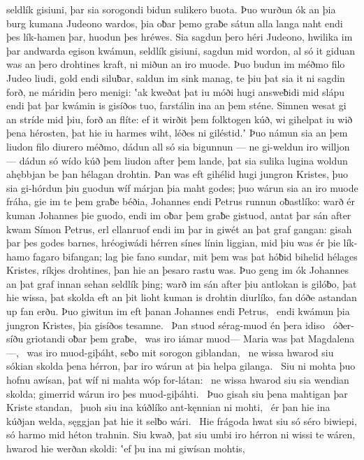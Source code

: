 seldlík gisiuni, þar sia sorogondi
bidun sulikero buota. Þuo wurðun ók an þia burg kumana
Judeono wardos, þia oƀar þemo graƀe sátun
alla langa naht endi þes lík-hamen þar,
huodun þes hréwes. Sia sagdun þero héri Judeono,
hwilika im þar andwarda egison kwámun,
seldlík gisiuni, sagdun mid wordon,
al só it giduan was an þero drohtines kraft,
ni miðun an iro muode. Þuo budun im méðmo filo
Judeo liudi, gold endi siluƀar,
saldun im sink manag, te þiu þat sia it ni sagdin forð,
ne máridin þero menigi: ʽak kweðat þat iu móði hugi
answeƀidi mid slápu endi þat þar kwámin is gisíðos tuo,
farstálin ina an þem sténe. Simnen wesat gi an stríde mid þiu,
forð an flíte: ef it wirðit þem folktogen kúð,
wi gihelpat iu wið þena hérosten, þat hie iu harmes wiht,
léðes ni giléstid.ʼ Þuo námun sia an þem liudon filo
diurero méðmo, dádun all só sia bigunnun
— ne gi-weldun iro willjon — dádun só wído kúð
þem liudon after þem lande, þat sia sulika lugina woldun
ahębbjan be þan hélagan drohtin. Þan was eft gihélid hugi
jungron Kristes, þuo sia gi-hórdun þiu guodun wíf
márjan þia maht godes; þuo wárun sia an iro muode fráha,
gie im te þem graƀe béðia, Johannes endi Petrus
runnun oƀastlíko: warð ér kuman
Johannes þie guodo, endi im oƀar þem graƀe gistuod,
antat þar sán after kwam Símon Petrus,
erl ellanruof endi im þar in giwét
an þat graf gangan: gisah þar þes godes barnes,
hréogiwádi hérren sínes
línin liggian, mid þiu was ér þie lík-hamo
fagaro bifangan; lag þie fano sundar,
mit þem was þat hóƀid bihelid hélages Kristes,
ríkjes drohtines, þan hie an þesaro rastu was.
Þuo geng im ók Johannes an þat graf innan
sehan seldlík þing; warð im sán after þiu
antlokan is gilóƀo, þat hie wissa, þat skolda eft an þit lioht kuman
is drohtin diurlíko, fan dóðe astandan
up fan erðu. Þuo giwitun im eft þanan
Johannes endi Petrus, \hld\ endi kwámun þia jungron Kristes,
þia gisíðos tesamne. \hld\ Þan stuod sérag-muod
én þera idiso \hld\ óðer-síðu
griotandi oƀar þem graƀe, \hld\ was iro iámar muod—
Maria was þat Magdalena—, \hld\ was iro muod-giþáht,
seƀo mit sorogon giblandan, \hld\ ne wissa hwarod siu sókian skolda
þena hérron, þar iro wárun at þia helpa gilanga. \hld\ Siu ni mohta þuo hofnu awísan,
þat wíf ni mahta wóp for-látan: \hld\ ne wissa hwarod siu sia wendian skolda;
gimerrid wárun iro þes muod-giþáhti. \hld\ Þuo gisah siu þena mahtigan þar
Kriste standan, \hld\ þuoh siu ina kúðlíko
ant-kęnnian ni mohti, \hld\ ér þan hie ina kúðjan welda,
sęggjan þat hie it selƀo wári. \hld\ Hie frágoda hwat siu só séro biwiepi,
só harmo mid héton trahnin. Siu kwað, þat siu umbi iro hérron ni wissi
te wáren, hwarod hie werðan skoldi: ʽef þu ina mi giwísan mohtis,
